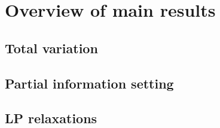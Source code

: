 \section{Overview of main results}

\subsection{Total variation}
\subsection{Partial information setting}
\subsection{LP relaxations}
